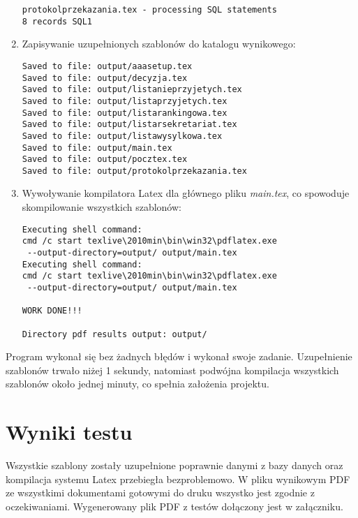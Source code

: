 \begin{enumerate}
\begin{lstlisting}
protokolprzekazania.tex - processing SQL statements
8 records SQL1

 \end{lstlisting}
 
   \item Zapisywanie uzupełnionych szablonów do katalogu wynikowego:
 \begin{lstlisting}
Saved to file: output/aaasetup.tex
Saved to file: output/decyzja.tex
Saved to file: output/listanieprzyjetych.tex
Saved to file: output/listaprzyjetych.tex
Saved to file: output/listarankingowa.tex
Saved to file: output/listarsekretariat.tex
Saved to file: output/listawysylkowa.tex
Saved to file: output/main.tex
Saved to file: output/pocztex.tex
Saved to file: output/protokolprzekazania.tex

 \end{lstlisting}
 
   \item Wywoływanie kompilatora Latex dla głównego pliku \emph{main.tex}, co spowoduje skompilowanie wszystkich szablonów:
 \begin{lstlisting}
Executing shell command:
cmd /c start texlive\2010min\bin\win32\pdflatex.exe
 --output-directory=output/ output/main.tex
Executing shell command:
cmd /c start texlive\2010min\bin\win32\pdflatex.exe
 --output-directory=output/ output/main.tex

WORK DONE!!!

Directory pdf results output: output/
 \end{lstlisting}
\end{enumerate}
Program wykonał się bez żadnych błędów i wykonał swoje zadanie. Uzupełnienie szablonów trwało niżej 1 sekundy, natomiast podwójna kompilacja wszystkich szablonów około jednej minuty, co spełnia założenia projektu. 

\section{Wyniki testu}

Wszystkie szablony zostały uzupełnione poprawnie danymi z bazy danych oraz kompilacja systemu Latex przebiegła bezproblemowo. W pliku wynikowym PDF ze wszystkimi dokumentami gotowymi do druku wszystko jest zgodnie z oczekiwaniami. Wygenerowany plik PDF z testów dołączony jest w załączniku.


